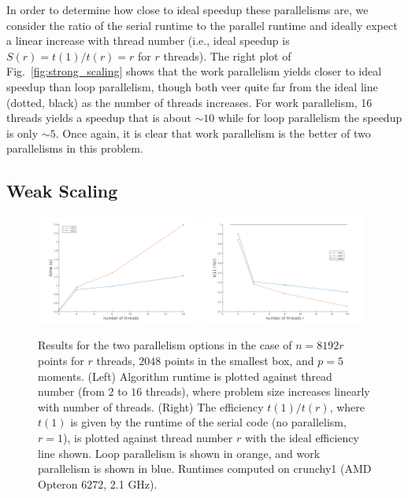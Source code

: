 \documentclass{article}
\begin{document}
In order to determine how close to ideal speedup these parallelisms are, we consider the ratio of the serial runtime to the parallel runtime and ideally expect a linear increase with thread number (i.e., ideal speedup is $S(r) = t(1)/t(r) = r$ for $r$ threads). The right plot of Fig.~\ref{fig:strong_scaling} shows that the work parallelism yields closer to ideal speedup than loop parallelism, though both veer quite far from the ideal line (dotted, black) as the number of threads increases. For work parallelism, 16 threads yields a speedup that is about $\sim 10$ while for loop parallelism the speedup is only $\sim 5$. Once again, it is clear that work parallelism is the better of two parallelisms in this problem.

\subsection{Weak Scaling}
\begin{figure}
  \centering
  \includegraphics[width=0.48\textwidth]{./figures/weak_scalability.png} %
  \includegraphics[width=0.48\textwidth]{./figures/weak_scalability2.png}
  \caption{Results for the two parallelism options in the case of $n=8192r$ points for $r$ threads, $2048$ points in the smallest box, and $p=5$ moments. (Left) Algorithm runtime is plotted against thread number (from $2$ to $16$ threads), where problem size increases linearly with number of threads. (Right) The efficiency $t(1)/t(r)$, where $t(1)$ is given by the runtime of the serial code (no parallelism, $r=1$), is plotted against thread number $r$ with the ideal efficiency line shown. Loop parallelism is shown in orange, and work parallelism is shown in blue. Runtimes computed on crunchy1 (AMD Opteron 6272, 2.1 GHz).}
  \label{fig:weak_scaling}
\end{figure}
\end{document}
